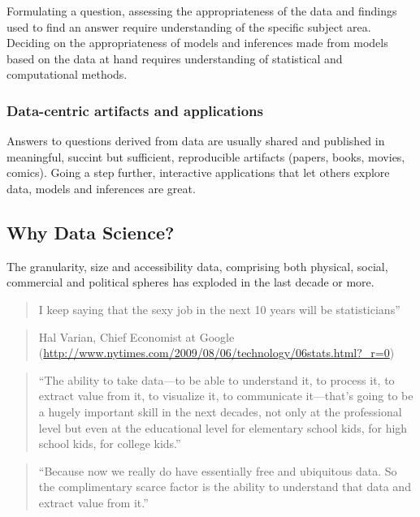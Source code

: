 \documentclass[]{article}
\theoremstyle{definition}
\theoremstyle{definition}
\theoremstyle{remark}
\begin{document}
Formulating a question, assessing the appropriateness of the data and
findings used to find an answer require understanding of the specific
subject area. Deciding on the appropriateness of models and inferences
made from models based on the data at hand requires understanding of
statistical and computational methods.

\subsubsection{Data-centric artifacts and
applications}\label{data-centric-artifacts-and-applications}

Answers to questions derived from data are usually shared and published
in meaningful, succint but sufficient, reproducible artifacts (papers,
books, movies, comics). Going a step further, interactive applications
that let others explore data, models and inferences are great.

\subsection{Why Data Science?}\label{why-data-science}

The granularity, size and accessibility data, comprising both physical,
social, commercial and political spheres has exploded in the last decade
or more.

\begin{quote}
I keep saying that the sexy job in the next 10 years will be
statisticians''
\end{quote}

\begin{quote}
Hal Varian, Chief Economist at Google
(\url{http://www.nytimes.com/2009/08/06/technology/06stats.html?_r=0})
\end{quote}

\begin{quote}
``The ability to take data---to be able to understand it, to process it,
to extract value from it, to visualize it, to communicate it---that's
going to be a hugely important skill in the next decades, not only at
the professional level but even at the educational level for elementary
school kids, for high school kids, for college kids.''
\end{quote}

\begin{quote}
``Because now we really do have essentially free and ubiquitous data. So
the complimentary scarce factor is the ability to understand that data
and extract value from it.''
\end{quote}
\end{document}
